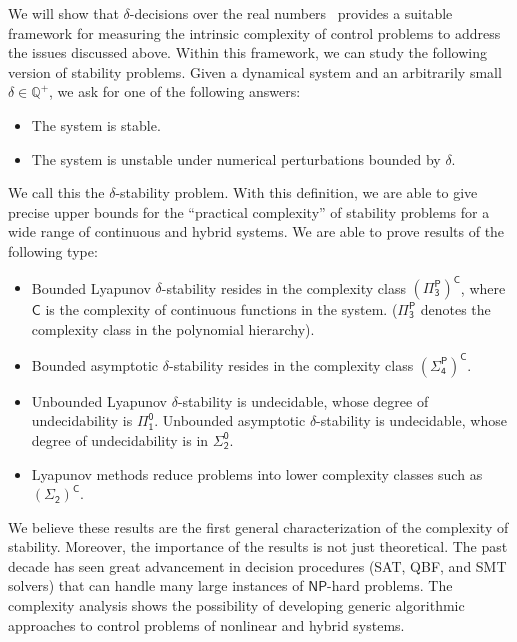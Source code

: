 \documentclass[12pt]{article}
\theoremstyle{plain}
\theoremstyle{definition}
\newcommand{\np}{\mathsf{NP}}
\begin{document}
We will show that $\delta$-decisions over the real numbers~\cite{DBLP:conf/lics/GaoAC12,DBLP:conf/cade/GaoAC12} provides a suitable framework for measuring the intrinsic complexity of control problems to address the issues discussed above. Within this framework, we can study the following version of stability problems. Given a dynamical system and an arbitrarily small $\delta\in \mathbb{Q}^+$, we ask for one of the following answers:
\begin{itemize}
\item The system is stable.
\item The system is unstable under numerical perturbations bounded by $\delta$.
\end{itemize}
We call this the $\delta$-stability problem. With this definition, we are able to give precise upper bounds for the ``practical complexity'' of stability problems for a wide range of continuous and hybrid systems. We are able to prove results of the following type:
\begin{itemize}
\item Bounded Lyapunov $\delta$-stability resides in the complexity class $\mathsf{(\Pi^P_3)^C}$, where $\mathsf{C}$ is the complexity of continuous functions in the system. ($\mathsf{\Pi^P_3}$ denotes the complexity class in the polynomial hierarchy).
\item Bounded asymptotic $\delta$-stability resides in the complexity class $\mathsf{(\Sigma^P_4)^C}$.
\item Unbounded Lyapunov $\delta$-stability is undecidable, whose degree of undecidability is $\mathsf{\Pi^0_1}$. Unbounded asymptotic $\delta$-stability is undecidable, whose degree of undecidability is in $\mathsf{\Sigma^0_2}$.
\item Lyapunov methods reduce problems into lower complexity classes such as $\mathsf{(\Sigma_2)^C}$.
\end{itemize}
We believe these results are the first general characterization of the complexity of stability. Moreover, the importance of the results is not just theoretical. The past decade has seen great advancement in decision procedures (SAT, QBF, and SMT solvers) that can handle many large instances of $\np$-hard problems. The complexity analysis shows the possibility of developing generic algorithmic approaches to control problems of nonlinear and hybrid systems.
\end{document}
